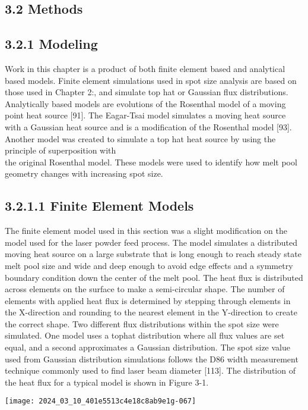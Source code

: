 \documentclass[10pt]{article}
\begin{document}
\subsection*{3.2 Methods}
\subsection*{3.2.1 Modeling}
Work in this chapter is a product of both finite element based and analytical based models. Finite element simulations used in spot size analysis are based on those used in Chapter 2:, and simulate top hat or Gaussian flux distributions. Analytically based models are evolutions of the Rosenthal model of a moving point heat source [91]. The Eagar-Tsai model simulates a moving heat source with a Gaussian heat source and is a modification of the Rosenthal model [93]. Another model was created to simulate a top hat heat source by using the principle of superposition with\\
the original Rosenthal model. These models were used to identify how melt pool geometry changes with increasing spot size.

\subsection*{3.2.1.1 Finite Element Models}
The finite element model used in this section was a slight modification on the model used for the laser powder feed process. The model simulates a distributed moving heat source on a large substrate that is long enough to reach steady state melt pool size and wide and deep enough to avoid edge effects and a symmetry boundary condition down the center of the melt pool. The heat flux is distributed across elements on the surface to make a semi-circular shape. The number of elements with applied heat flux is determined by stepping through elements in the X-direction and rounding to the nearest element in the Y-direction to create the correct shape. Two different flux distributions within the spot size were simulated. One model uses a tophat distribution where all flux values are set equal, and a second approximates a Gaussian distribution. The spot size value used from Gaussian distribution simulations follows the D86 width measurement technique commonly used to find laser beam diameter [113]. The distribution of the heat flux for a typical model is shown in Figure 3-1.

\begin{center}
\texttt{[image: 2024\_03\_10\_401e5513c4e18c8ab9e1g-067]}
\end{center}
\end{document}
